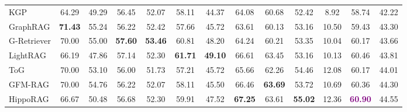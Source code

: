 \documentclass{article}
\begin{document}
\begin{table}[htbp]
{\begin{tabular}{lcccccccccccc}
KGP                     & 64.29                     & 49.29                     & 56.45                     & 52.07                     & 58.11                     & 44.37                     & 64.08                     & 60.68                     & 52.42                     & 8.92                     & 58.74                     & 42.22                     \\
GraphRAG                & \textbf{71.43}                     & 55.24                     & 56.22                     & 52.42                     & 57.66                     & 45.72                     & 63.61                     & 60.13                     & 53.16                     & 10.50                    & 59.43                     & 43.30                     \\
G-Retriever             & 70.00                     & 55.00                     & \textbf{57.60}                     & \textbf{53.46}                     & 60.81                     & 48.20                     & 64.24                     & 60.21                     & 53.35                     & 10.04                    & 60.17                     & 43.66                     \\
LightRAG                & 66.19                     & 47.86                     & 57.14                     & 52.30                     & \textbf{61.71}                     & \textbf{49.10}                     & 66.61                     & 63.45                     & 53.16                     & 10.13                    & 60.46                     & 43.81                     \\
ToG                     & 70.00                     & 53.10                     & 56.00                     & 51.73                     & 57.21                     & 45.72                     & 65.66                     & 62.26                     & 54.46                     & 12.08                    & 60.17                     & 44.01                     \\ 
GFM-RAG                 &         70.00             &         54.76            &          56.22          &          52.07            &         58.11            &            45.50           &         66.46              &       \textbf{63.69}                &           53.72         &         10.69            &       60.36               &     44.30                \\
HippoRAG                & 66.67                     & 50.48                     & 56.68                     & 52.30                     & 59.91                     & 47.52                     & \textbf{67.25}                     & 63.61                     & \textbf{55.02}                     & 12.36                    & \textcolor{purple}{\textbf{60.90}}                    & 44.55                     \\

\end{tabular}}
\end{table}
\end{document}

